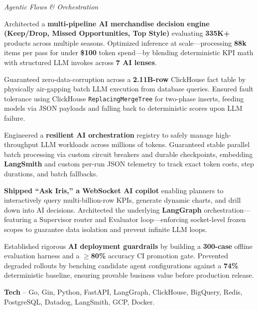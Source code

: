 \textcolor{Project}{\textit{Agentic Flows \& Orchestration}}
\vspace{-0.65ex}
\begin{zitemize}
    \item Architected a \textbf{multi-pipeline AI merchandise decision engine (Keep/Drop, Missed Opportunities, Top Style)} evaluating \textbf{335K+} products across multiple seasons. Optimized inference at scale---processing \textbf{88k} items per pass for under \textbf{\$100} token spend---by blending deterministic KPI math with structured LLM invokes across \textbf{7 AI lenses}.
    \item Guaranteed zero-data-corruption across a \textbf{2.11B-row} ClickHouse fact table by physically air-gapping batch LLM execution from database queries. Ensured fault tolerance using ClickHouse \texttt{ReplacingMergeTree} for two-phase inserts, feeding models via JSON payloads and falling back to deterministic scores upon LLM failure.
    \item Engineered a \textbf{resilient AI orchestration} registry to safely manage high-throughput LLM workloads across millions of tokens. Guaranteed stable parallel batch processing via custom circuit breakers and durable checkpoints, embedding \textbf{LangSmith} and custom per-run JSON telemetry to track exact token costs, step durations, and batch fallbacks.
    \item \textbf{Shipped ``Ask Iris,'' a WebSocket AI copilot} enabling planners to interactively query multi-billion-row KPIs, generate dynamic charts, and drill down into AI decisions. Architected the underlying \textbf{LangGraph} orchestration---featuring a Supervisor router and Evaluator loop---enforcing socket-level frozen scopes to guarantee data isolation and prevent infinite LLM loops.
    \item Established rigorous \textbf{AI deployment guardrails} by building a \textbf{300-case} offline evaluation harness and a $\geq$\textbf{80\%} accuracy CI promotion gate. Prevented degraded rollouts by benching candidate agent configurations against a \textbf{74\%} deterministic baseline, ensuring provable business value before production release.
    \item \textbf{Tech} -- Go, Gin, Python, FastAPI, LangGraph, ClickHouse, BigQuery, Redis, PostgreSQL, Datadog, LangSmith, GCP, Docker.
\end{zitemize}
